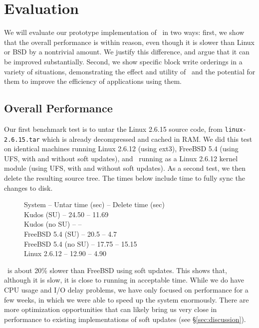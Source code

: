 \section {Evaluation}
\label{sec:evaluation}

We will evaluate our prototype implementation of \Kudos\ in two ways: first, we
show that the overall performance is within reason, even though it is slower
than Linux or BSD by a nontrivial amount. We justify this difference, and argue
that it can be improved substantially. Second, we show specific block write
orderings in a variety of situations, demonstrating the effect and utility of
\opgroups\ and the potential for them to improve the efficiency of applications
using them.

\subsection {Overall Performance}

Our first benchmark test is to untar the Linux 2.6.15 source code, from
\texttt{linux-2.6.15.tar} which is already decompressed and cached in RAM. We
did this test on identical machines running Linux 2.6.12 (using ext3), FreeBSD
5.4 (using UFS, with and without soft updates), and \Kudos\ running as a Linux
2.6.12 kernel module (using UFS, with and without soft updates). As a second
test, we then delete the resulting source tree. The times below include time to
fully sync the changes to disk.

\begin{figure}[htb]
System -- Untar time (sec) -- Delete time (sec) \\
Kudos (SU) -- 24.50 -- 11.69 \\ 
Kudos (no SU) -- -- \\ 
FreeBSD 5.4 (SU) -- 20.5 -- 4.7 \\ 
FreeBSD 5.4 (no SU) -- 17.75 -- 15.15 \\ 
Linux 2.6.12 -- 12.90 -- 4.90 
\end{figure}

\Kudos\ is about 20\% slower than FreeBSD using soft updates. This shows
that, although it is slow, it is close to running in acceptable time. While
we do have CPU usage and I/O delay problems, we have only focused on
performance for a few weeks, in which we were able to speed up the system
enormously.  There are more optimization opportunities that can likely
bring us very close in performance to existing implementations of soft
updates (see \S\ref{sec:discussion}).

